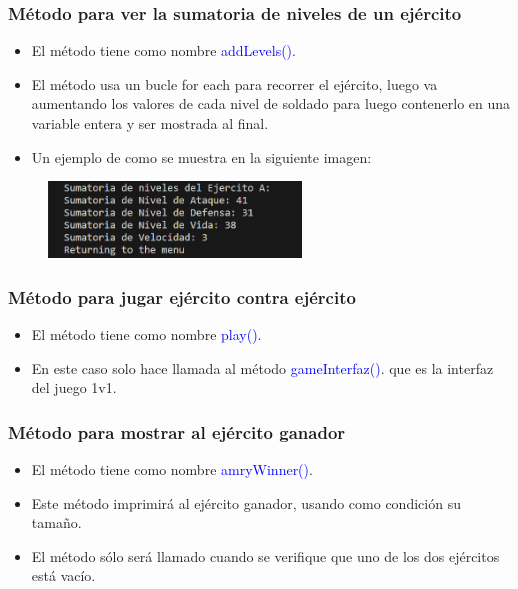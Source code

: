 \documentclass{article}
\begin{document}
\subsubsection{Método para ver la sumatoria de niveles de un ejército}
\begin{itemize}
    \item El método tiene como nombre \textcolor{blue}{addLevels()}.
    \item El método usa un bucle for each para recorrer el ejército, luego va aumentando los valores de cada nivel de soldado para luego contenerlo en una variable entera y ser mostrada al final.
\end{itemize}


\begin{itemize}\begin{itemize}\item Un ejemplo de como se muestra en la siguiente imagen:
\end{itemize}\end{itemize}
\begin{figure}[H]
    \centering
    \includegraphics[width=0.6\textwidth,keepaspectratio]{img/12addLevels.png}
    \caption{}
\end{figure}


\subsubsection{Método para jugar ejército contra ejército}
\begin{itemize}
    \item El método tiene como nombre \textcolor{blue}{play()}.
    \item En este caso solo hace llamada al método \textcolor{blue}{gameInterfaz()}. que es la interfaz del juego 1v1.
\end{itemize}



\subsubsection{Método para mostrar al ejército ganador}
\begin{itemize}
    \item El método tiene como nombre \textcolor{blue}{amryWinner()}.
    \item Este método imprimirá al ejército ganador, usando como condición su tamaño.
    \item El método sólo será llamado cuando se verifique que uno de los dos ejércitos está vacío.
\end{itemize}

\end{document}
